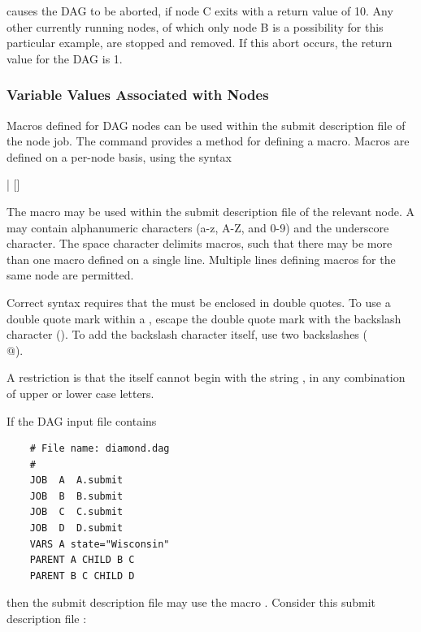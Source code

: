 causes the DAG to be aborted, if node C exits with a return value of 10.
Any other currently running nodes, 
of which only node B is a possibility for this particular example, 
are stopped and removed.
If this abort occurs, the return value for the DAG is 1.


\subsubsection{\label{dagman:VARS}Variable Values Associated with Nodes}

Macros defined for DAG nodes can be used within the submit description
file of the node job. 
The  command provides a method for defining a macro.
Macros are defined on a per-node basis, using the syntax

 | 
[]

The macro may be used within the
submit description file of the relevant node.  
A  may contain alphanumeric characters (a-z, A-Z, and 0-9)
and the underscore character.
The space character delimits macros,
such that there may be more than one macro defined on a single line.
Multiple lines defining macros for the same node are permitted.

Correct syntax requires that the  must be
enclosed in double quotes.
To use a double quote mark within a ,
escape the double quote mark with the backslash character (\verb@\@).
To add the backslash character itself, use two backslashes (\verb@\\@).

A restriction is that the  itself cannot begin with the string
,
in any combination of upper or lower case letters.


If the DAG input file contains
\footnotesize
\begin{verbatim}
    # File name: diamond.dag
    #
    JOB  A  A.submit 
    JOB  B  B.submit 
    JOB  C  C.submit	
    JOB  D  D.submit
    VARS A state="Wisconsin"
    PARENT A CHILD B C
    PARENT B C CHILD D

\end{verbatim}
\normalsize

then the submit description file  may use 
the macro \verb@state@.
Consider this 
submit description file :

